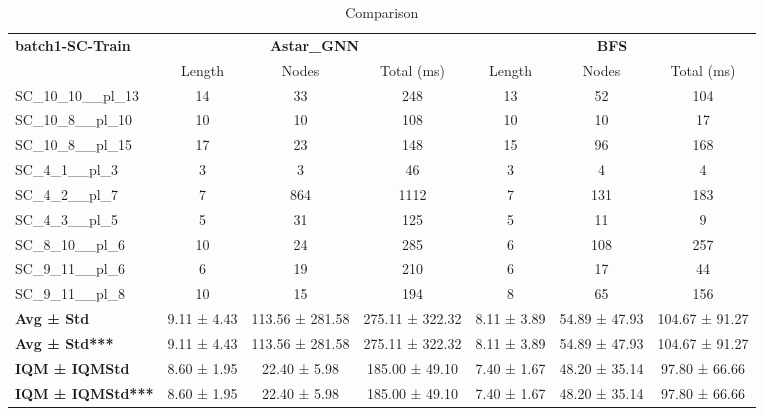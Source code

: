 \begin{table}[!ht]
\centering
\small
\begin{tabular}{l|ccc|ccc}
\multirow{2}{*}{\textbf{batch1-SC-Train}} & \multicolumn{3}{c|}{\textbf{Astar\_GNN}} & \multicolumn{3}{c}{\textbf{BFS}} \\
\cline{2-7}
& Length & Nodes & Total (ms) & Length & Nodes & Total (ms) \\
\hline
SC\_10\_10\_\_pl\_13 & 14 & 33 & 248 & 13 & 52 & 104 \\
SC\_10\_8\_\_pl\_10 & 10 & 10 & 108 & 10 & 10 & 17 \\
SC\_10\_8\_\_pl\_15 & 17 & 23 & 148 & 15 & 96 & 168 \\
SC\_4\_1\_\_pl\_3 & 3 & 3 & 46 & 3 & 4 & 4 \\
SC\_4\_2\_\_pl\_7 & 7 & 864 & 1112 & 7 & 131 & 183 \\
SC\_4\_3\_\_pl\_5 & 5 & 31 & 125 & 5 & 11 & 9 \\
SC\_8\_10\_\_pl\_6 & 10 & 24 & 285 & 6 & 108 & 257 \\
SC\_9\_11\_\_pl\_6 & 6 & 19 & 210 & 6 & 17 & 44 \\
SC\_9\_11\_\_pl\_8 & 10 & 15 & 194 & 8 & 65 & 156 \\
\hline
\textbf{Avg ± Std} & 9.11 ± 4.43 & 113.56 ± 281.58 & 275.11 ± 322.32 & 8.11 ± 3.89 & 54.89 ± 47.93 & 104.67 ± 91.27 \\
\textbf{Avg ± Std***} & 9.11 ± 4.43 & 113.56 ± 281.58 & 275.11 ± 322.32 & 8.11 ± 3.89 & 54.89 ± 47.93 & 104.67 ± 91.27 \\
\textbf{IQM ± IQMStd} & 8.60 ± 1.95 & 22.40 ± 5.98 & 185.00 ± 49.10 & 7.40 ± 1.67 & 48.20 ± 35.14 & 97.80 ± 66.66 \\
\textbf{IQM ± IQMStd***} & 8.60 ± 1.95 & 22.40 ± 5.98 & 185.00 ± 49.10 & 7.40 ± 1.67 & 48.20 ± 35.14 & 97.80 ± 66.66 \\
\end{tabular}
\caption{Comparison}
\label{tab:batch1_SC_comparison_train}
\end{table}
